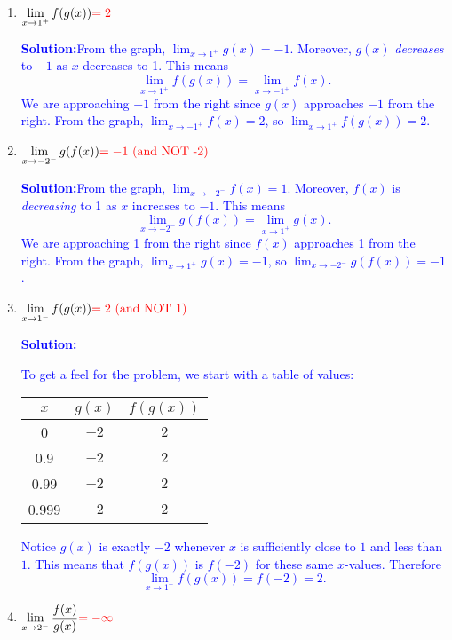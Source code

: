 \documentclass[letterpaper,11pt]{article}
\def\ds{\displaystyle}
\newif\ifsolutions
\newcommand{\tsol}[1]{\textcolor{red}{#1}}
\newcommand{\sol}[1]{\textcolor{blue}{\textbf{Solution:}}\quad \textcolor{blue}{#1}}
\newcommand{\tsol}[1]{\textcolor{white}{#1}}
\newcommand{\sol}[1]{\vfill}
\newcommand{\fgraff}{
\begin{minipage}[l][.30\textwidth]{3 in}{
\begin{tikzpicture}
\begin{axis}[
   	xmin=-3.25, xmax=3.25,
	ymin=-2.25, ymax=2.25,
	major tick length={0},
	xtick={-3,-2,...,3}, ytick={-2,-1,...,2},
	line width=1pt, title={\textbf{Graph of $f$}},
 	axis lines=center, height=2 in, width=3 in, grid=major,
 	restrict y to domain=-2.25:2.25
	]
	\addplot [mark=*, black, smooth, very thick] plot coordinates {(-3,2)(-2,1)};
	\addplot [mark=*, black, smooth, very thick] plot coordinates {(-2,3)};
	\addplot [mark=*, black, smooth, very thick] plot coordinates {(-2,0)(-1,1)};
	\addplot [mark=*, black, smooth, very thick] plot coordinates {(-1,2)(1,2)};
	\addplot [mark=*, black, smooth, very thick] plot coordinates {(2,-1)(3,-1)};
    \addplot [black, smooth, very thick, samples=299, domain=1:2] {(x-1)^2};
    \addplot [black, only marks, very thick, mark=*, mark options={scale=1, fill=white}]
    coordinates{(1,0) (2,1) (-1,2) (-2,1) (-2,0)};
    \addplot [black, only marks, very thick, mark=*] coordinates{(-2,2)};
\end{axis}
\end{tikzpicture}
}
\end{minipage}}
\newcommand{\ggraff}{
\begin{minipage}[l][.30\textwidth]{3 in}{
\begin{tikzpicture}
\begin{axis}[
   	xmin=-3.25, xmax=3.25,
	ymin=-2.25, ymax=2.25,
	major tick length={0},
	xtick={-3,-2,...,3}, ytick={-2,-1,...,2},
	line width=1pt, title={\textbf{Graph of $g$}},
 	axis lines=center, height=2 in, width=3 in, grid=major,
 	restrict y to domain=-2.25:2.25
	]
	\addplot [mark=*, black, smooth, very thick] plot coordinates {(-3,-1)(-1,-1)};
	\addplot [mark=*, black, smooth, very thick] plot coordinates {(1,-1)(3,1)};
	\addplot [black, very thick, mark=*, mark options={scale=1, fill=white}] plot coordinates {(-1,-2)(1,-2)};
\end{axis}
\end{tikzpicture}
}
\end{minipage}}
\begin{document}
\begin{enumerate}
\ifsolutions\else
\newpage

\begin{center}
\begin{tabular}{l r}
\fgraff & \ggraff
\end{tabular}
\end{center}
\fi

\item $\ds \lim_{x\rightarrow 1^+} f(g(x))\tsol{=2}$

\sol{From the graph, $\ds \lim_{x \to 1^+} g(x) = -1$. Moreover, $g(x)$ \emph{decreases} to $-1$ as $x$ decreases to 1.
This means
\[
   \lim_{x \to 1^+} f(g(x)) = \lim_{x \to -1^+} f(x).
\]
We are approaching $-1$ from the right since $g(x)$ approaches $-1$ from the right. From the graph, $\ds \lim_{x \to -1^+} f(x) = 2$, so $\ds \lim_{x \to 1^+} f(g(x)) = 2$.
}

\item $\ds \lim_{x \rightarrow -2^-} g(f(x))\tsol{=-1\text{ (and NOT -2)}}$

\sol{From the graph, $\ds \lim_{x \to -2^-} f(x) = 1$. Moreover, $f(x)$ is \emph{decreasing} to 1 as $x$ increases to $-1$.
This means
\[
   \lim_{x \to -2^-} g(f(x)) = \lim_{x \to 1^+} g(x).
\]
We are approaching 1 from the right since $f(x)$ approaches 1 from the right.
From the graph, $\ds \lim_{x \to 1^+} g(x) = -1$, so $\ds \lim_{x \to -2^-} g(f(x)) = -1$.
}

\item $\ds \lim_{x\rightarrow 1^-} f(g(x))\tsol{=2\text{ (and NOT 1)}}$

\sol{To get a feel for the problem, we start with a table of values:
\begin{center}
\begin{tabular}{c|c|c}
  $x$ & $g(x)$ & $f(g(x))$ \\ \hline
   0    &  $-2$ & $2$  \\
   0.9 &  $-2$ & $2$ \\
   0.99 & $-2$ & $2$ \\
   0.999 & $-2$ & $2$
\end{tabular}
\end{center}
Notice $g(x)$ is exactly $-2$ whenever $x$ is sufficiently close to $1$ and less than $1$.
This means that $f(g(x))$ is $f(-2)$ for these same $x$-values. Therefore
\[
   \lim_{x \to 1^-} f(g(x)) = f(-2) = 2.
\]
}

\item $\ds \lim_{x\rightarrow 2^-} \frac{f(x)}{g(x)}\tsol{=-\infty}$


\end{enumerate}
\end{document}
